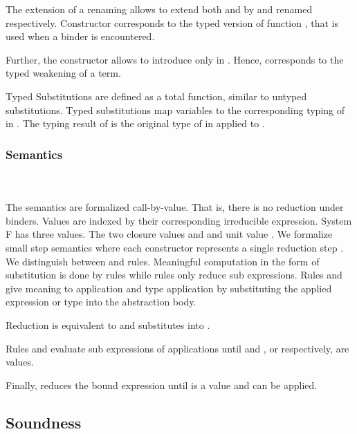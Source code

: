 \noindent The extension of a renaming  allows to extend both  and  by  and renamed  respectively. Constructor  corresponds to the typed version of function , that is used when a binder is encountered. 

\noindent Further, the constructor  allows to introduce  only in . Hence,  corresponds to the typed weakening of a term.

\noindent Typed Substitutions are defined as a total function, similar to untyped substitutions.
\FSubTyping
Typed substitutions  map variables    to the corresponding typing of  in . The typing result of  is the original type of  in  applied to .
\subsubsection{Semantics}\hfill\\\\
The semantics are formalized call-by-value. That is, there is no reduction under binders. Values are indexed by their corresponding irreducible expression.
\FVal
System F has three values. The two closure values  and  and unit value .
We formalize small step semantics where each constructor represents a single reduction step   .
We distinguish between  and  rules. 
Meaningful computation in the form of substitution is done by  rules while  rules only reduce sub expressions.
\FSemantics
Rules  and  give meaning to application and type application by substituting the applied expression or type into the abstraction body. 

\noindent Reduction  is equivalent to  and substitutes  into . 

\noindent  Rules  and  evaluate sub expressions of applications until  and , or  respectively, are values. 

\noindent  Finally,  reduces the bound expression  until  is a value and  can be applied. 

\subsection{Soundness}

